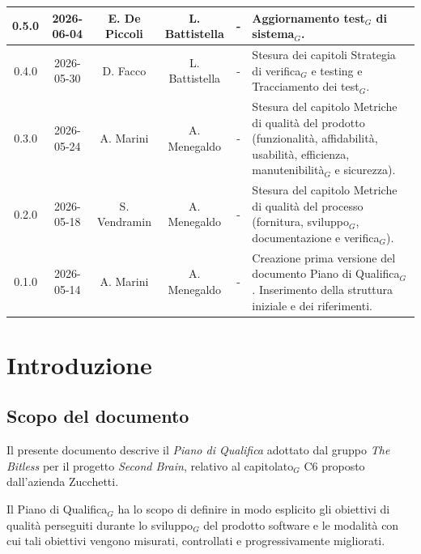 \documentclass[a4paper, 10pt, colorlinks=true, linkcolor=black, urlcolor=blue, citecolor=blue, hidelinks]{article}
\begin{document}
\begin{longtable}{|c|c|c|c|c|p{3.5cm}|}
    \hline
    0.5.0 & 2026-06-04 & E. De Piccoli & L. Battistella & - & Aggiornamento test$_G$ di sistema$_G$. \\ 
    \hline
    0.4.0 & 2026-05-30 & D. Facco & L. Battistella & - & Stesura dei capitoli Strategia di verifica$_G$ e testing e Tracciamento dei test$_G$. \\
    \hline
    0.3.0 & 2026-05-24 & A. Marini & A. Menegaldo & - & Stesura del capitolo Metriche di qualità del prodotto (funzionalità, affidabilità, usabilità, efficienza, manutenibilità$_G$ e sicurezza). \\
    \hline
    0.2.0 & 2026-05-18 & S. Vendramin & A. Menegaldo & - & Stesura del capitolo Metriche di qualità del processo (fornitura, sviluppo$_G$, documentazione e verifica$_G$). \\
    \hline
    0.1.0 & 2026-05-14 & A. Marini & A. Menegaldo & - & Creazione prima versione del documento Piano di Qualifica$_G$. Inserimento della struttura iniziale e dei riferimenti. \\ \hline

\end{longtable}
\endgroup

\newpage

\tableofcontents
\newpage

\listoftables
\newpage

\listoffigures
\newpage

\section{Introduzione}

\subsection{Scopo del documento}

Il presente documento descrive il \textit{Piano di Qualifica} adottato dal gruppo \textit{The Bitless} per il progetto \textit{Second Brain}, relativo al capitolato$_G$ C6 proposto dall'azienda Zucchetti.

Il Piano di Qualifica$_G$ ha lo scopo di definire in modo esplicito gli obiettivi di qualità perseguiti durante lo sviluppo$_G$ del prodotto software e le modalità con cui tali obiettivi vengono misurati, controllati e progressivamente migliorati.
\end{document}
